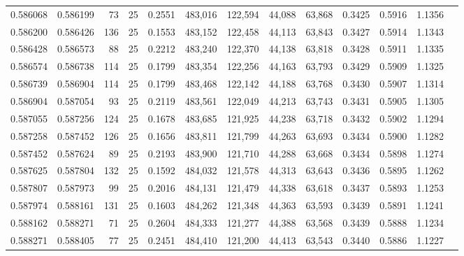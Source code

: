 \begin{tabular}{rrrrrrrrrrrrr}
0.586068 & 0.586199 &    73 &  25 &                                     0.2551 & 483,016 & 122,594 &  44,088 &  63,868 & 0.3425 & 0.5916 & 1.1356 \\
0.586200 & 0.586426 &   136 &  25 &                                     0.1553 & 483,152 & 122,458 &  44,113 &  63,843 & 0.3427 & 0.5914 & 1.1343 \\
0.586428 & 0.586573 &    88 &  25 &                                     0.2212 & 483,240 & 122,370 &  44,138 &  63,818 & 0.3428 & 0.5911 & 1.1335 \\
0.586574 & 0.586738 &   114 &  25 &                                     0.1799 & 483,354 & 122,256 &  44,163 &  63,793 & 0.3429 & 0.5909 & 1.1325 \\
0.586739 & 0.586904 &   114 &  25 &                                     0.1799 & 483,468 & 122,142 &  44,188 &  63,768 & 0.3430 & 0.5907 & 1.1314 \\
0.586904 & 0.587054 &    93 &  25 &                                     0.2119 & 483,561 & 122,049 &  44,213 &  63,743 & 0.3431 & 0.5905 & 1.1305 \\
0.587055 & 0.587256 &   124 &  25 &                                     0.1678 & 483,685 & 121,925 &  44,238 &  63,718 & 0.3432 & 0.5902 & 1.1294 \\
0.587258 & 0.587452 &   126 &  25 &                                     0.1656 & 483,811 & 121,799 &  44,263 &  63,693 & 0.3434 & 0.5900 & 1.1282 \\
0.587452 & 0.587624 &    89 &  25 &                                     0.2193 & 483,900 & 121,710 &  44,288 &  63,668 & 0.3434 & 0.5898 & 1.1274 \\
0.587625 & 0.587804 &   132 &  25 &                                     0.1592 & 484,032 & 121,578 &  44,313 &  63,643 & 0.3436 & 0.5895 & 1.1262 \\
0.587807 & 0.587973 &    99 &  25 &                                     0.2016 & 484,131 & 121,479 &  44,338 &  63,618 & 0.3437 & 0.5893 & 1.1253 \\
0.587974 & 0.588161 &   131 &  25 &                                     0.1603 & 484,262 & 121,348 &  44,363 &  63,593 & 0.3439 & 0.5891 & 1.1241 \\
0.588162 & 0.588271 &    71 &  25 &                                     0.2604 & 484,333 & 121,277 &  44,388 &  63,568 & 0.3439 & 0.5888 & 1.1234 \\
0.588271 & 0.588405 &    77 &  25 &                                     0.2451 & 484,410 & 121,200 &  44,413 &  63,543 & 0.3440 & 0.5886 & 1.1227 \\

\end{tabular}
